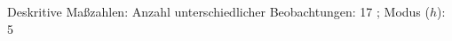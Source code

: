 				\label{tableValues:bdem07_g1}
				\vspace*{-\baselineskip}
                    \begin{noten}
                	    \note{} Deskritive Maßzahlen:
                	    Anzahl unterschiedlicher Beobachtungen: 17%
                	    ; 
                	      Modus ($h$): 5
                     \end{noten}


